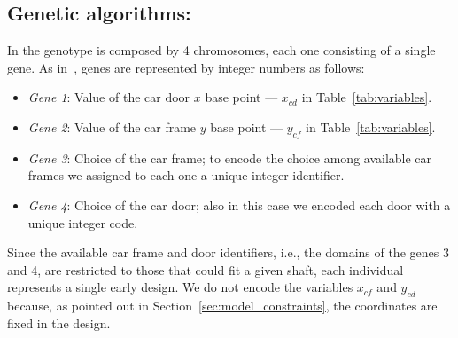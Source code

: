 \subsection{Genetic algorithms: \liftcreatega{}}
\label{sec:ga_enc}

In \liftcreatega{} the genotype is composed by 4 chromosomes, each one   
consisting of a single gene. As in~\cite{carlson1996genetic}, 
genes are represented by integer numbers as follows:
\begin{itemize}
	\item \emph{Gene 1}: Value of the car door $x$ base point --- $x_{cd}$ 
	in Table~\ref{tab:variables}.
	\item \emph{Gene 2}: Value of the car frame $y$ base point --- $y_{cf}$ 
	in Table~\ref{tab:variables}.
	\item \emph{Gene 3}: Choice of the car frame; to encode the choice
	among available car frames we assigned to each one a unique integer
	identifier.
	\item \emph{Gene 4}: Choice of the car door; also in this case 
	we encoded each door with a unique integer code.
\end{itemize}
Since the available car frame and door identifiers, i.e., the domains of 
the genes 3 and 4, are restricted to those that could fit a given
shaft, each individual represents a single early design. We do not encode
the variables $x_{cf}$ and $y_{cd}$ because, as pointed out in 
Section~\ref{sec:model_constraints}, the coordinates are 
fixed in the design.

